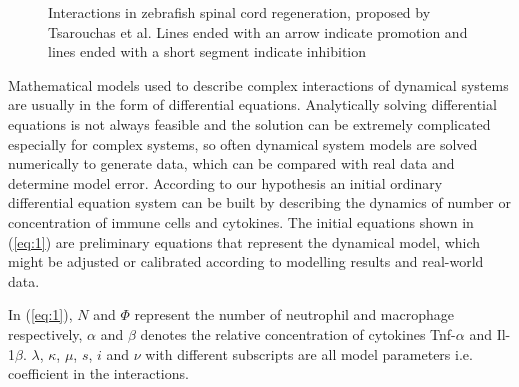 \documentclass{article}
\begin{document}
\begin{figure}

\begin{center}
\end{center}

\caption{Interactions in zebrafish spinal cord regeneration, proposed by Tsarouchas 
et al\cite{ref:Tsarouchas}. Lines ended with an arrow indicate promotion and lines 
ended with a short segment indicate inhibition}
\label{fig:1}

\end{figure}

Mathematical models used to describe complex interactions of dynamical systems 
are usually in the form of differential equations. Analytically solving differential 
equations is not always feasible and the solution can be extremely complicated 
especially for complex systems, so often dynamical system models are solved 
numerically to generate data, which can be compared with real data and determine 
model error. According to our hypothesis an initial ordinary differential equation 
system can be built by describing the dynamics of number or concentration of immune 
cells and cytokines. The initial equations shown in (\ref{eq:1}) are preliminary equations 
that represent the dynamical model, which might be adjusted or calibrated according 
to modelling results and real-world data. 

In (\ref{eq:1}), $N$ and $\Phi$ represent the
number of neutrophil and macrophage respectively, $\alpha$ and $\beta$ denotes the
relative concentration of cytokines Tnf-$\alpha$ and Il-1$\beta$. 
$\lambda$, $\kappa$, $\mu$, $s$, $i$ and $\nu$ with different subscripts are 
all model parameters i.e. coefficient in the interactions.
\end{document}
